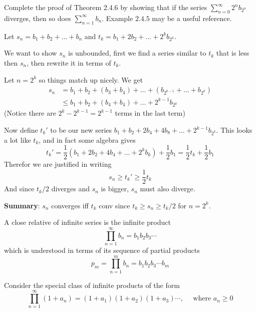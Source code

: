 \begin{exercise}
  Complete the proof of Theorem 2.4.6 by showing that if the series $\sum_{n=0}^{\infty} 2^{n} b_{2^{n}}$ diverges, then so does $\sum_{n=1}^{\infty} b_{n}$. Example $2.4 .5$ may be a useful reference.
\end{exercise}

\begin{solution}
  Let $s_n = b_1 + b_2 + \dots + b_n$ and $t_k = b_1 + 2b_2 + \dots + 2^kb_{2^k}$.

  We want to show $s_n$ is unbounded, first we find a series similar to $t_k$ that is less then $s_n$, then rewrite it in terms of $t_k$.

  Let $n = 2^k$ so things match up nicely. We get
  $$
  \begin{aligned}
  s_n
  &=   b_1 + b_2 + (b_3 + b_4) + \dots + (b_{2^{k-1}} + \dots + b_{2^k}) \\
  &\le b_1 + b_2 + (b_4 + b_4) + \dots + 2^{k-1}b_{2^k}
  \end{aligned}
  $$
  (Notice there are $2^k - 2^{k-1} = 2^{k-1}$ terms in the last term)

  Now define $t_k'$ to be our new series $b_1 + b_2 + 2b_4 + 4b_8 + \dots + 2^{k-1}b_{2^k}$.
  This looks a lot like $t_k$, and in fact some algebra gives
  $$
  t_k'
  = \frac 12 \left(b_1 + 2b_2 + 4b_4 + \dots + 2^kb_k\right) + \frac 12 b_1
  = \frac 12 t_k + \frac 12 b_1
  $$
  Therefor we are justified in writing
  $$
  s_n \ge t_k' \ge \frac 12 t_k
  $$
  And since $t_k/2$ diverges and $s_n$ is bigger, $s_n$ must also diverge.

  \textbf{Summary}: $s_n$ converges iff $t_k$ conv since $t_k \ge s_n \ge t_k/2$ for $n = 2^k$.
\end{solution}

\begin{exercise}
  A close relative of infinite series is the infinite product
  $$
  \prod_{n=1}^{\infty} b_{n}=b_{1} b_{2} b_{3} \cdots
  $$
  which is understood in terms of its sequence of partial products
  $$
  p_{m}=\prod_{n=1}^{m} b_{n}=b_{1} b_{2} b_{3} \cdots b_{m}
  $$

  Consider the special class of infinite products of the form
  $$
  \prod_{n=1}^{\infty}\left(1+a_{n}\right)=\left(1+a_{1}\right)\left(1+a_{2}\right)\left(1+a_{3}\right) \cdots, \quad \text { where } a_{n} \geq 0
  $$
\end{exercise}

